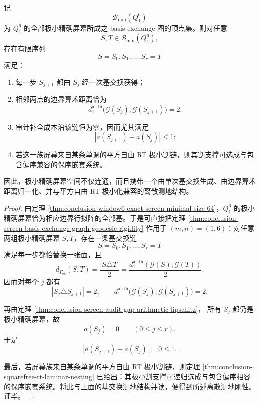 \begin{theorem}[极小精确屏幕的交换测地刚性]\label{thm:conclusion-screen-exchange-geodesic-rt-compatible-rigidity}
记
\[
\mathcal B_{\min}(Q_1^6)
\]
为 \(Q_1^6\) 的全部极小精确屏幕所成之 basis-exchange 图的顶点集。则对任意
\[
S,T\in \mathcal B_{\min}(Q_1^6),
\]
存在有限序列
\[
S=S_0,S_1,\dots,S_r=T
\]
满足：
\begin{enumerate}
  \item 每一步 \(S_{j+1}\) 都由 \(S_j\) 经一次基交换获得；
  \item 相邻两点的边界算术距离恰为
        \[
        d_1^{\mathrm{arith}}\bigl(\mathcal G(S_j),\mathcal G(S_{j+1})\bigr)=2;
        \]
  \item 审计补全成本沿该链恒为零，因而尤其满足
        \[
        |a(S_{j+1})-a(S_j)|\le 1;
        \]
  \item 若这一族屏幕来自某条单调的平方自由 RT 极小割链，则其割支撑可选成与包含偏序兼容的保序嵌套系统。
\end{enumerate}
因此，极小精确屏幕空间不仅连通，而且携带一个由单次基交换生成、由边界算术距离归一化、并与平方自由 RT 极小化兼容的离散测地结构。
\end{theorem}
\begin{proof}
由定理 \ref{thm:conclusion-window6-exact-screen-minimal-size-64}，\(Q_1^6\) 的极小精确屏幕恰为相应边界行拟阵的全部基。于是可直接把定理 \ref{thm:conclusion-screen-basis-exchange-graph-geodesic-rigidity} 作用于 \((m,n)=(1,6)\)：对任意两组极小精确屏幕 \(S,T\)，存在一条基交换链
\[
S=S_0,S_1,\dots,S_r=T
\]
满足每一步都恰替换一张面，且
\[
d_{\Gamma_{\mathrm{ex}}}(S,T)
=
\frac{|S\triangle T|}{2}
=
\frac{d_1^{\mathrm{arith}}(\mathcal G(S),\mathcal G(T))}{2}.
\]
因而对每个 \(j\) 都有
\[
|S_j\triangle S_{j+1}|=2,
\qquad
d_1^{\mathrm{arith}}\bigl(\mathcal G(S_j),\mathcal G(S_{j+1})\bigr)=2.
\]

再由定理 \ref{thm:conclusion-screen-audit-gap-arithmetic-lipschitz}，
所有 \(S_j\) 都仍是极小精确屏幕，故
\[
a(S_j)=0
\qquad
(0\le j\le r).
\]
于是
\[
|a(S_{j+1})-a(S_j)|=0\le 1.
\]

最后，若屏幕族来自某条单调的平方自由 RT 极小割链，则定理 \ref{thm:conclusion-squarefree-rt-laminar-nesting} 已给出：其极小割支撑可递归选成与包含偏序相容的保序嵌套系统。将此与上面的基交换测地结构并读，便得到所述离散测地刚性。证毕。
\end{proof}


